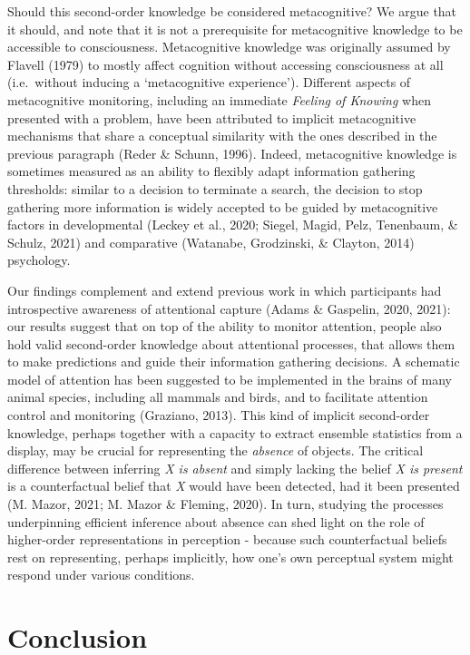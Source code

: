 \documentclass[12pt,twoside]{reedthesis}
\begin{document}
Should this second-order knowledge be considered metacognitive? We argue that it should, and note that it is not a prerequisite for metacognitive knowledge to be accessible to consciousness. Metacognitive knowledge was originally assumed by Flavell (1979) to mostly affect cognition without accessing consciousness at all (i.e.~without inducing a `metacognitive experience'). Different aspects of metacognitive monitoring, including an immediate \emph{Feeling of Knowing} when presented with a problem, have been attributed to implicit metacognitive mechanisms that share a conceptual similarity with the ones described in the previous paragraph (Reder \& Schunn, 1996). Indeed, metacognitive knowledge is sometimes measured as an ability to flexibly adapt information gathering thresholds: similar to a decision to terminate a search, the decision to stop gathering more information is widely accepted to be guided by metacognitive factors in developmental (Leckey et al., 2020; Siegel, Magid, Pelz, Tenenbaum, \& Schulz, 2021) and comparative (Watanabe, Grodzinski, \& Clayton, 2014) psychology.

Our findings complement and extend previous work in which participants had introspective awareness of attentional capture (Adams \& Gaspelin, 2020, 2021): our results suggest that on top of the ability to monitor attention, people also hold valid second-order knowledge about attentional processes, that allows them to make predictions and guide their information gathering decisions. A schematic model of attention has been suggested to be implemented in the brains of many animal species, including all mammals and birds, and to facilitate attention control and monitoring (Graziano, 2013). This kind of implicit second-order knowledge, perhaps together with a capacity to extract ensemble statistics from a display, may be crucial for representing the \emph{absence} of objects. The critical difference between inferring \emph{X is absent} and simply lacking the belief \emph{X is present} is a counterfactual belief that \emph{X} would have been detected, had it been presented (M. Mazor, 2021; M. Mazor \& Fleming, 2020). In turn, studying the processes underpinning efficient inference about absence can shed light on the role of higher-order representations in perception - because such counterfactual beliefs rest on representing, perhaps implicitly, how one's own perceptual system might respond under various conditions.

\hypertarget{conclusion}{%
\section{Conclusion}\label{conclusion}}
\end{document}
